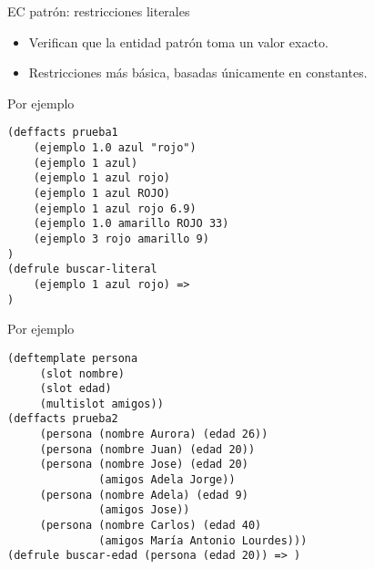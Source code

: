 \documentclass[usenames,dvipsnames,aspectratio=169]{beamer}
\begin{document}
\begin{frame}[fragile]{EC patrón: restricciones literales}
	\begin{itemize}
		\item Verifican que la entidad patrón toma un valor exacto.
		\item Restricciones más básica, basadas únicamente en constantes.
	\end{itemize}
	\begin{minipage}{.4\linewidth}
	\begin{exampleblock}{\footnotesize Por ejemplo}
		\scriptsize
		\begin{verbatim}
(deffacts prueba1
    (ejemplo 1.0 azul "rojo")
    (ejemplo 1 azul)
    (ejemplo 1 azul rojo)
    (ejemplo 1 azul ROJO)
    (ejemplo 1 azul rojo 6.9)
    (ejemplo 1.0 amarillo ROJO 33)
    (ejemplo 3 rojo amarillo 9)
)
(defrule buscar-literal
    (ejemplo 1 azul rojo) =>
)
		\end{verbatim}
	\end{exampleblock}
	\end{minipage}
	\hfill
	\begin{minipage}{.5\linewidth}
	\begin{exampleblock}{\footnotesize Por ejemplo}
		\scriptsize
		\begin{verbatim}
(deftemplate persona
     (slot nombre)
     (slot edad)
     (multislot amigos))
(deffacts prueba2
     (persona (nombre Aurora) (edad 26))
     (persona (nombre Juan) (edad 20))
     (persona (nombre Jose) (edad 20)
              (amigos Adela Jorge))
     (persona (nombre Adela) (edad 9)
              (amigos Jose))
     (persona (nombre Carlos) (edad 40)
              (amigos María Antonio Lourdes)))
(defrule buscar-edad (persona (edad 20)) => )
		\end{verbatim}
	\end{exampleblock}
\end{minipage}
\end{frame}
\end{document}
